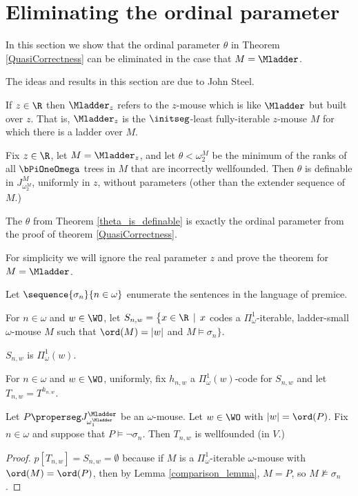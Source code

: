 \documentclass[oneside,12pt]{amsart}
\begin{document}
\section{Eliminating the ordinal parameter}
\label{section:eliminate_ordinal_parameters}

In this section we show that the ordinal parameter $\theta$ in Theorem
\ref{QuasiCorrectness} can be eliminated in the case that $M=\Mladder$.

The ideas and results in this section are due to John Steel.

\begin{definition}
If $z\in\R$ then $\Mladder_z$ refers to the $z$-mouse which is like $\Mladder$ but built over $z$.
That is, $\Mladder_z$ is the $\initseg$-least fully-iterable $z$-mouse $M$ for which there is
a ladder over $M$.
\end{definition}

\begin{theorem}
\label{theta_is_definable}
Fix $z\in\R$, let $M = \Mladder_z$, and let  $\theta<\omega_2^M$ be the
minimum of the ranks of all
$\bPiOneOmega$ trees in $M$ that are  incorrectly wellfounded.
Then $\theta$ is definable in $J^M_{\omega_2^M}$, uniformly in $z$,
without parameters (other than the extender sequence of $M$.)
\end{theorem}

The $\theta$ from Theorem \ref{theta_is_definable} is exactly the ordinal parameter
from the proof of theorem \ref{QuasiCorrectness}.

For simplicity we will ignore the real parameter $z$ and prove the theorem for $M=\Mladder$.


\begin{definition}
Let $\sequence{\sigma_n}{n\in\omega}$ enumerate the sentences in the language of premice.

For $n\in\omega$ and $w\in\WO$, let
$S_{n,w}=\big\{x\in \R \,\mid\, x$  codes a $\Pi^1_{\omega}$-iterable,
ladder-small $\omega$-mouse $M$ such that $\ord(M)=|w|$ and  $M\models\sigma_n\big\}$.

$S_{n,w}$ is $\Pi^1_{\omega}(w)$.

For $n\in\omega$ and $w\in\WO$, uniformly, fix $h_{n,w}$ a $\Pi^1_{\omega}(w)$-code for $S_{n,w}$
and let $T_{n,w}=T^{h_{n,w}}$.
\end{definition}

\begin{lemma}
\label{T_n_w_correctly_wellfounded}
Let $P\properseg J^{\Mladder}_{\omega_1^{\Mladder}}$ be an $\omega$-mouse. Let $w\in\WO$ with
$|w|=\ord(P)$. Fix $n\in\omega$
and suppose that $P\models \neg \sigma_n$. Then $T_{n,w}$ is wellfounded (in $V$.)
\end{lemma}
\begin{proof}
$p[T_{n,w}]=S_{n,w} = \emptyset$ because if $M$ is a $\Pi^1_{\omega}$-iterable $\omega$-mouse with
$\ord(M) = \ord(P)$, then by Lemma \ref{comparison_lemma}, $M=P$, so $M\not\models\sigma_n$.
\end{proof}
\end{document}
